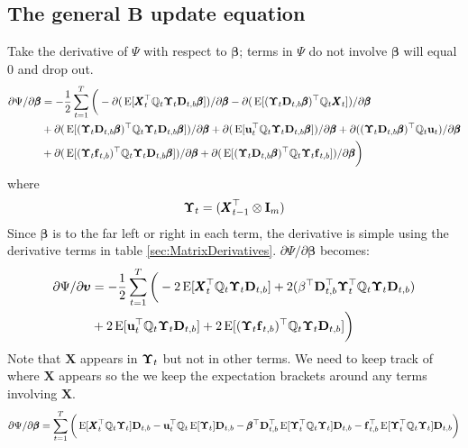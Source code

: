 \documentclass[]{article}
\def\bbeta{\pmb{\beta}}
\def\BB{\mbox{$\mathbf B$}}	\def\bb{\mbox{$\mathbf b$}}
\def\DD{\mbox{$\mathbf D$}}	\def\dd{\mbox{$\mathbf d$}}
\def\II{\mbox{$\mathbf I$}} \def\ii{\mbox{$\mathbf i$}}
\def\XX{\mbox{$\pmb{X}$}}	\def\xx{\mbox{$\pmb{x}$}}
\def\E{\,\textup{\textrm{E}}}
\begin{document}
\subsection{The general $\BB$ update equation}
Take the derivative of $\Psi$ with respect to $\bbeta$; terms in $\Psi$  do not involve $\bbeta$ will equal 0 and drop out.  
\begin{equation}\label{eq:B.general1}
\begin{split}
\partial\Psi/\partial\bbeta
 &= - \frac{1}{2}\sum_{t=1}^T \bigg( -\partial(\E[\XX_t^\top\Qm_t\Bm_t\DD_{t,b}\bbeta])/\partial\bbeta
 - \partial(\E[(\Bm_t\DD_{t,b}\bbeta)^\top\Qm_t\XX_t])/\partial\bbeta \\
&+ \partial(\E[(\Bm_t\DD_{t,b}\bbeta)^\top\Qm_t\Bm_t\DD_{t,b}\bbeta])/\partial\bbeta
 + \partial(\E[\uu_t^\top\Qm_t\Bm_t\DD_{t,b}\bbeta])/\partial\bbeta
+ \partial((\Bm_t\DD_{t,b}\bbeta)^\top\Qm_t\uu_t)/\partial\bbeta \\
&+ \partial(\E[(\Bm_t\ff_{t,b})^\top\Qm_t\Bm_t\DD_{t,b}\bbeta])/\partial\bbeta
 + \partial(\E[(\Bm_t\DD_{t,b}\bbeta)^\top\Qm_t\Bm_t\ff_{t,b}])/\partial\bbeta
\bigg)\end{split}
\end{equation}
where
\begin{equation}
\Bm_t = (\XX_{t-1}^\top \otimes \II_m)
\end{equation}Since $\bbeta$ is to the far left or right in each term, the derivative is simple using the derivative terms in table \ref{sec:MatrixDerivatives}.
$\partial\Psi/\partial\bbeta$ becomes:
\begin{equation}\label{eq:B.general1b}
\begin{split}
\partial\Psi/\partial\pmb{\upsilon}
&= - \frac{1}{2}\sum_{t=1}^T \bigg(  
-2\E[\XX_t^\top\Qm_t\Bm_t\DD_{t,b}] + 2(\beta^\top\DD_{t,b}^\top\Bm_t^\top\Qm_t\Bm_t\DD_{t,b})  \\
&+ 2\E[\uu_t^\top\Qm_t\Bm_t\DD_{t,b}] + 2\E[(\Bm_t\ff_{t,b})^\top\Qm_t\Bm_t\DD_{t,b}] \bigg)
\end{split}\end{equation}
Note that $\XX$ appears in $\mbox{\boldmath $\Upsilon$}_t$ but not in other terms. We need to keep track of where $\XX$ appears so the we keep the expectation brackets around any terms involving $\XX$.
\begin{equation}
\begin{split}
\partial\Psi/\partial\bbeta
= \sum_{t=1}^T \bigg(  
\E[\XX_t^\top\Qm_t\Bm_t]\DD_{t,b} - \uu_t^\top\Qm_t\E[\Bm_t]\DD_{t,b} 
- \bbeta^\top\DD_{t,b}^\top\E[\Bm_t^\top\Qm_t\Bm_t]\DD_{t,b} - \ff_{t,b}^\top\E[\Bm_t^\top\Qm_t\Bm_t]\DD_{t,b} \bigg)
\end{split}
\end{equation}
\end{document}
